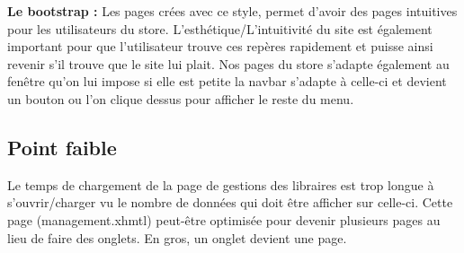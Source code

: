 	\textbf{Le bootstrap :} Les pages crées avec ce style, permet d'avoir des pages intuitives pour les utilisateurs du store. L'esthétique/L'intuitivité du site est également important pour que l'utilisateur trouve ces repères rapidement et puisse ainsi revenir s'il trouve que le site lui plait. 
	Nos pages du store s'adapte également au fenêtre qu'on lui impose si elle est petite la navbar s'adapte à celle-ci et devient un bouton ou l'on clique dessus pour afficher le reste du menu.
 
	\subsection{Point faible}
	Le temps de chargement de la page de gestions des libraires est trop longue à s'ouvrir/charger vu le nombre de données qui doit être afficher sur celle-ci. 
	Cette page (management.xhmtl) peut-être optimisée pour devenir plusieurs pages au lieu de faire des onglets. En gros, un onglet devient une page. 